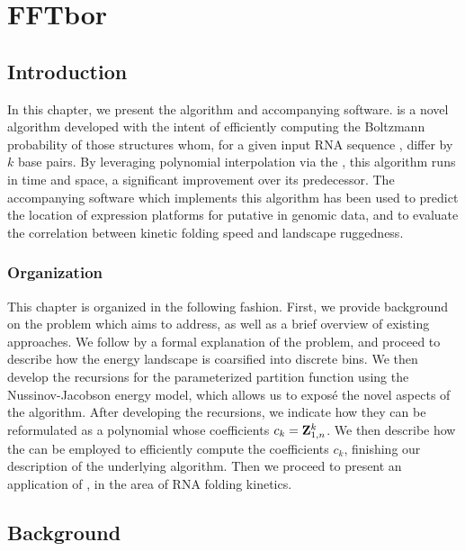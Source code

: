 
\chapter{FFTbor}
\label{ch:fftbor}


\section{Introduction}
\label{sec:fftbor:intro}

In this chapter, we present the \fftbor algorithm and accompanying software.
\fftbor is a novel algorithm developed with the intent of efficiently computing
the Boltzmann probability of those structures whom, for a given input RNA
sequence \seq, differ by $k$ base pairs. By leveraging polynomial interpolation
via the \fft, this algorithm runs in  time and
 space, a significant improvement over its predecessor. The accompanying
software which implements this algorithm has been used to predict the location
of expression platforms for putative \rbs in genomic data, and to
evaluate the correlation between kinetic folding speed and landscape ruggedness.

\subsection{Organization}
\label{subsec:fftbor:org}

This chapter is organized in the following fashion. First, we provide
background on
the problem which \fftbor aims to address, as well as a brief overview of
existing approaches. We follow by a formal explanation of the problem, and
proceed to describe how the energy landscape is coarsified into discrete bins.
We then develop the recursions for the parameterized partition function using
the Nussinov-Jacobson energy model, which allows us to exposé the novel aspects
of the algorithm. After developing the recursions, we indicate how they can be
reformulated as a polynomial whose coefficients $c_k={\bf Z}^{k}_{1,n}$. We then
describe how the \fft can be employed to efficiently compute the coefficients
$c_k$, finishing our description of the underlying algorithm. Then we proceed
to present an application of \fftbor, in the area of RNA folding kinetics.

\section{Background}
\label{sec:fftbor:bkgrnd}

